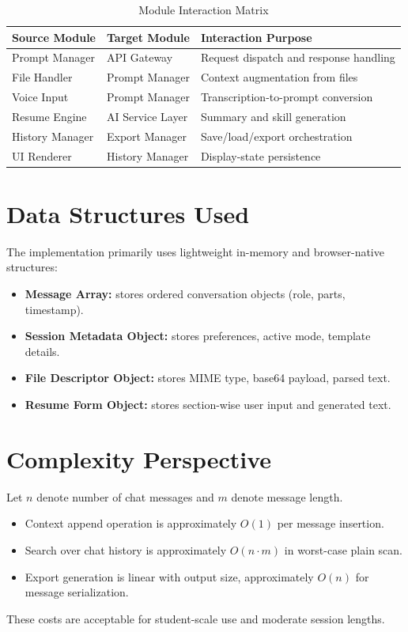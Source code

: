 \documentclass[12pt,a4paper]{report}
\begin{document}
\begin{table}[H]
\centering
\caption{Module Interaction Matrix}
\label{tab:interaction_matrix}
\begin{tabular}{|p{1.6in}|p{1.6in}|p{1.6in}|}
\hline
\textbf{Source Module} & \textbf{Target Module} & \textbf{Interaction Purpose} \\
\hline
Prompt Manager & API Gateway & Request dispatch and response handling \\
\hline
File Handler & Prompt Manager & Context augmentation from files \\
\hline
Voice Input & Prompt Manager & Transcription-to-prompt conversion \\
\hline
Resume Engine & AI Service Layer & Summary and skill generation \\
\hline
History Manager & Export Manager & Save/load/export orchestration \\
\hline
UI Renderer & History Manager & Display-state persistence \\
\hline
\end{tabular}
\end{table}

\section{Data Structures Used}
The implementation primarily uses lightweight in-memory and browser-native structures:
\begin{itemize}
  \item \textbf{Message Array:} stores ordered conversation objects (role, parts, timestamp).
  \item \textbf{Session Metadata Object:} stores preferences, active mode, template details.
  \item \textbf{File Descriptor Object:} stores MIME type, base64 payload, parsed text.
  \item \textbf{Resume Form Object:} stores section-wise user input and generated text.
\end{itemize}

\section{Complexity Perspective}
Let $n$ denote number of chat messages and $m$ denote message length.
\begin{itemize}
  \item Context append operation is approximately $O(1)$ per message insertion.
  \item Search over chat history is approximately $O(n \cdot m)$ in worst-case plain scan.
  \item Export generation is linear with output size, approximately $O(n)$ for message serialization.
\end{itemize}
These costs are acceptable for student-scale use and moderate session lengths.
\end{document}
